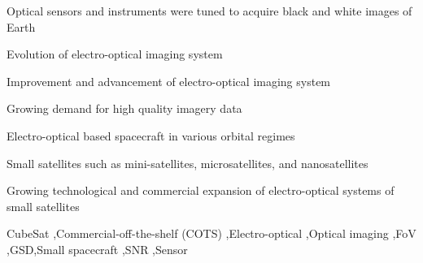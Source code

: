 \documentclass[final,5p,times,twocolumn,authoryear]{elsarticle}
\begin{document}
\begin{frontmatter}
\begin{highlights}
\item Optical sensors and instruments were tuned to acquire black and white images of Earth
\item Evolution of electro-optical imaging system
\item Improvement and advancement of electro-optical imaging system
\item Growing demand for high quality imagery data
\item Electro-optical based spacecraft in various orbital regimes
\item Small satellites such as mini-satellites, microsatellites, and nanosatellites
\item Growing technological and commercial expansion of electro-optical systems of small satellites
\end{highlights}

\begin{keyword}
	CubeSat \sep Commercial-off-the-shelf (COTS) \sep  Electro-optical \sep Optical imaging  \sep  FoV \sep GSD\sep Small spacecraft \sep  SNR \sep  Sensor 

\end{keyword}
\end{frontmatter}


\end{document}
